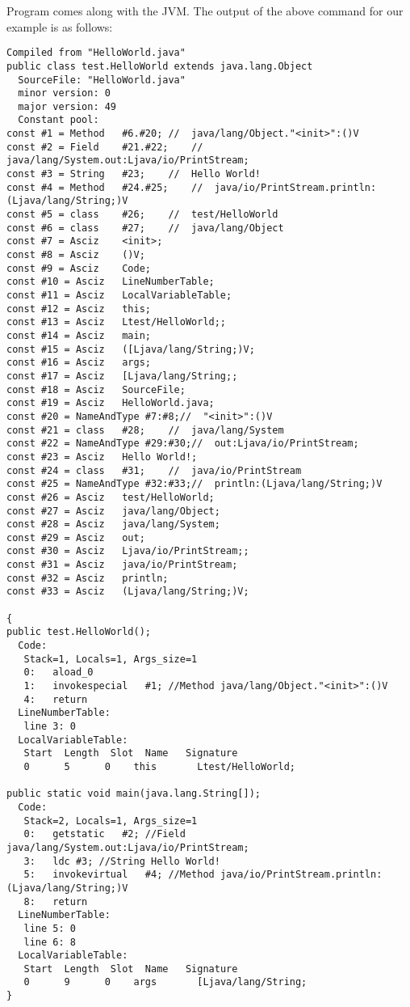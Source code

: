 Program  comes along with the JVM.  The output of the
above command for our example is as follows:

\begin{framed}
\begin{verbatim}
Compiled from "HelloWorld.java"
public class test.HelloWorld extends java.lang.Object
  SourceFile: "HelloWorld.java"
  minor version: 0
  major version: 49
  Constant pool:
const #1 = Method   #6.#20; //  java/lang/Object."<init>":()V
const #2 = Field    #21.#22;    //  java/lang/System.out:Ljava/io/PrintStream;
const #3 = String   #23;    //  Hello World!
const #4 = Method   #24.#25;    //  java/io/PrintStream.println:(Ljava/lang/String;)V
const #5 = class    #26;    //  test/HelloWorld
const #6 = class    #27;    //  java/lang/Object
const #7 = Asciz    <init>;
const #8 = Asciz    ()V;
const #9 = Asciz    Code;
const #10 = Asciz   LineNumberTable;
const #11 = Asciz   LocalVariableTable;
const #12 = Asciz   this;
const #13 = Asciz   Ltest/HelloWorld;;
const #14 = Asciz   main;
const #15 = Asciz   ([Ljava/lang/String;)V;
const #16 = Asciz   args;
const #17 = Asciz   [Ljava/lang/String;;
const #18 = Asciz   SourceFile;
const #19 = Asciz   HelloWorld.java;
const #20 = NameAndType #7:#8;//  "<init>":()V
const #21 = class   #28;    //  java/lang/System
const #22 = NameAndType #29:#30;//  out:Ljava/io/PrintStream;
const #23 = Asciz   Hello World!;
const #24 = class   #31;    //  java/io/PrintStream
const #25 = NameAndType #32:#33;//  println:(Ljava/lang/String;)V
const #26 = Asciz   test/HelloWorld;
const #27 = Asciz   java/lang/Object;
const #28 = Asciz   java/lang/System;
const #29 = Asciz   out;
const #30 = Asciz   Ljava/io/PrintStream;;
const #31 = Asciz   java/io/PrintStream;
const #32 = Asciz   println;
const #33 = Asciz   (Ljava/lang/String;)V;

{
public test.HelloWorld();
  Code:
   Stack=1, Locals=1, Args_size=1
   0:   aload_0
   1:   invokespecial   #1; //Method java/lang/Object."<init>":()V
   4:   return
  LineNumberTable:
   line 3: 0
  LocalVariableTable:
   Start  Length  Slot  Name   Signature
   0      5      0    this       Ltest/HelloWorld;

public static void main(java.lang.String[]);
  Code:
   Stack=2, Locals=1, Args_size=1
   0:   getstatic   #2; //Field java/lang/System.out:Ljava/io/PrintStream;
   3:   ldc #3; //String Hello World!
   5:   invokevirtual   #4; //Method java/io/PrintStream.println:(Ljava/lang/String;)V
   8:   return
  LineNumberTable:
   line 5: 0
   line 6: 8
  LocalVariableTable:
   Start  Length  Slot  Name   Signature
   0      9      0    args       [Ljava/lang/String;
}
\end{verbatim}
\end{framed}


